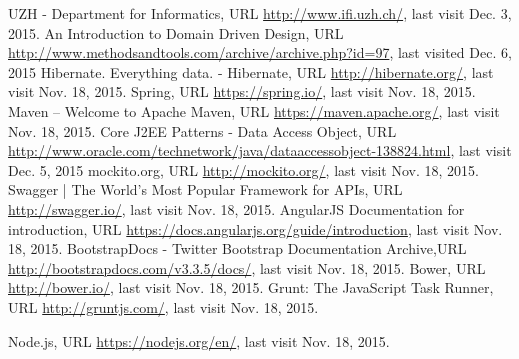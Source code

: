 \begin{thebibliography}{99}

 UZH - Department for Informatics, URL \url{http://www.ifi.uzh.ch/}, last visit Dec. 3, 2015.
 An Introduction to Domain Driven Design, URL \url{http://www.methodsandtools.com/archive/archive.php?id=97}, last visited Dec. 6, 2015
 Hibernate. Everything data. - Hibernate, URL \url{http://hibernate.org/}, last visit Nov. 18, 2015.
 Spring, URL \url{https://spring.io/}, last visit Nov. 18, 2015.
 Maven – Welcome to Apache Maven, URL \url{https://maven.apache.org/}, last visit Nov. 18, 2015.
 Core J2EE Patterns - Data Access Object, URL \url{http://www.oracle.com/technetwork/java/dataaccessobject-138824.html}, last visit Dec. 5, 2015
 mockito.org, URL \url{http://mockito.org/}, last visit Nov. 18, 2015.
 Swagger | The World's Most Popular Framework for APIs, URL \url{http://swagger.io/}, last visit Nov. 18, 2015.
 AngularJS Documentation for introduction, URL \url{https://docs.angularjs.org/guide/introduction}, last visit Nov. 18, 2015.
 BootstrapDocs - Twitter Bootstrap Documentation Archive,\newline URL \url{http://bootstrapdocs.com/v3.3.5/docs/}, last visit Nov. 18, 2015.
 Bower, URL \url{http://bower.io/}, last visit Nov. 18, 2015.
 Grunt: The JavaScript Task Runner, URL \url{http://gruntjs.com/}, last visit Nov. 18, 2015.

 Node.js, URL \url{https://nodejs.org/en/}, last visit Nov. 18, 2015.



\end{thebibliography}

